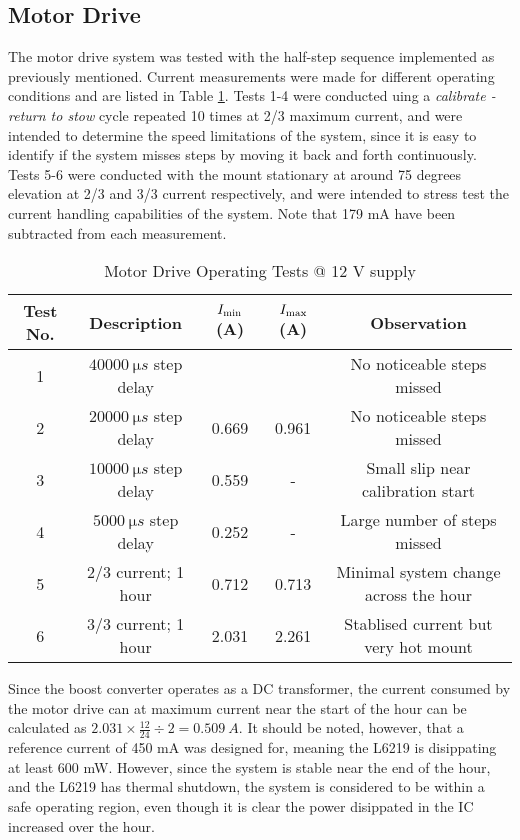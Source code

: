 \subsection{Motor Drive}
The motor drive system was tested with the half-step sequence implemented as previously mentioned. Current measurements were made for different operating conditions and are listed in Table \ref{tab:motorDriveTests}. Tests 1-4 were conducted uing a \textit{calibrate - return to stow} cycle repeated 10 times at 2/3 maximum current, and were intended to determine the speed limitations of the system, since it is easy to identify if the system misses steps by moving it back and forth continuously. Tests 5-6 were conducted with the mount stationary at around 75 degrees elevation at 2/3 and 3/3 current respectively, and were intended to stress test the current handling capabilities of the system. Note that 179 mA have been subtracted from each measurement.

\begin{table}[!htb]
  \centering
  \renewcommand{\arraystretch}{1.2}
  \hspace*{-1cm}
  \begin{tabular}{ |c|c|c|c|c| }
  \hline
  \textbf{Test No.}  & \textbf{Description} & \textbf{$I_{\textnormal{min}}$ (A)}   & \textbf{$I_{\textnormal{max}}$ (A)}  & Observation \\
  \hline
  1
  & $\SI{40000}{\micro s}$ step delay           
  & 
  & 
  & No noticeable steps missed
  \\  \hline
  2
  & $\SI{20000}{\micro s}$ step delay           
  & 0.669
  & 0.961
  & No noticeable steps missed
  \\  \hline
  3
  & $\SI{10000}{\micro s}$ step delay           
  & 0.559
  & -                   
  & Small slip near calibration start
  \\  \hline
  4
  & $\SI{5000}{\micro s}$ step delay           
  & 0.252
  & -                   
  & Large number of steps missed
  \\  \hline
  5
  & 2/3 current; 1 hour
  & 0.712
  & 0.713
  & Minimal system change across the hour
  \\  \hline
  6
  & 3/3 current; 1 hour
  & 2.031
  & 2.261
  & Stablised current but very hot mount
  \\  \hline
  \end{tabular}
  \caption{Motor Drive Operating Tests @ 12 V supply}
  \label{tab:motorDriveTests}
\end{table}

Since the boost converter operates as a DC transformer, the current consumed by the motor drive can at maximum current near the start of the hour can be calculated as $2.031 \times \frac{12}{24} \div 2 = \SI{0.509}{A}$. It should be noted, however, that a reference current of 450 mA was designed for, meaning the L6219 is disippating at least 600 mW. However, since the system is stable near the end of the hour, and the L6219 has thermal shutdown, the system is considered to be within a safe operating region, even though it is clear the power disippated in the IC increased over the hour.